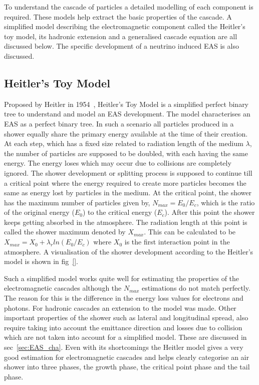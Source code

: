 To understand the cascade of particles a detailed modelling of each component is required. These models help extract the basic properties of the cascade. A simplified model describing the electromagnetic component called the Heitler's toy model, its hadronic extension and a generalised cascade equation are all discussed below. The specific development of a neutrino induced EAS is also discussed.  

\subsection*{Heitler's Toy Model}
\label{sec:Dev_Heitler}

Proposed by Heitler in 1954~\cite{heitler1984quantum}, Heitler's Toy Model is a simplified perfect binary tree to understand and model an EAS development. The model characterises an EAS as a perfect binary tree. In such a scenario all particles produced in a shower equally share the primary energy available at the time of their creation. At each step, which has a fixed size related to radiation length of the medium $\lambda$, the number of particles are supposed to be doubled, with each having the same energy. The energy loses which may occur due to collisions are completely ignored. The shower development or splitting process is supposed to continue till a critical point where the energy required to create more particles becomes the same as energy lost by particles in the medium. At the critical point, the shower has the maximum number of particles given by, $N_{max} = E_0/E_c$, which is the ratio of the original energy ($E_0$) to the critical energy ($E_c$). After this point the shower keeps getting absorbed in the atmosphere. The radiation length at this point is called the shower maximum denoted by $X_{max}$. This can be calculated to be $X_{max} = X_0 + \lambda_r ln(E_0/E_c)$ where $X_0$ is the first interaction point in the atmosphere. A visualisation of the shower development according to the Heitler's model is shown in fig~\ref{}.

Such a simplified model works quite well for estimating the properties of the electromagnetic cascades although the $N_{max}$ estimations do not match perfectly. The reason for this is the difference in the energy loss values for electrons and photons. For hadronic cascades an extension to the model was made. Other important properties of the shower such as lateral and longitudinal spread, also require taking into account the emittance direction and losses due to collision which are not taken into account for a simplified model. These are discussed in sec~\ref{sec:EAS_cha}. Even with its shortcomings the Heitler model gives a very good estimation for electromagnetic cascades and helps clearly categorise an air shower into three phases, the growth phase, the critical point phase and the tail phase. 

